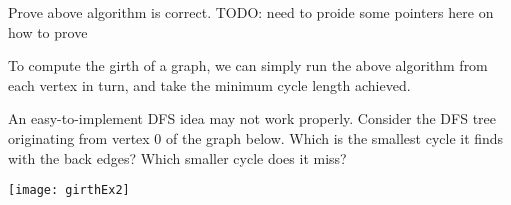 \begin{Boxample}[8] \label{ex:BFS-cycle} 
Prove above algorithm is correct.
{\color{red} TODO: need to proide some pointers here on how to prove}
%
%
\end{Boxample}

To compute the girth of a graph, we can simply run the above algorithm
from each vertex in turn, and take the minimum cycle length achieved.

\begin{Boxample}
An easy-to-implement DFS idea may not work properly. 
Consider the DFS tree originating from vertex $0$ of the graph below. 
Which is the smallest cycle it finds with the back edges? Which smaller cycle does it miss?
\begin{center}
  \texttt{[image: girthEx2]}
\end{center}
\end{Boxample}


